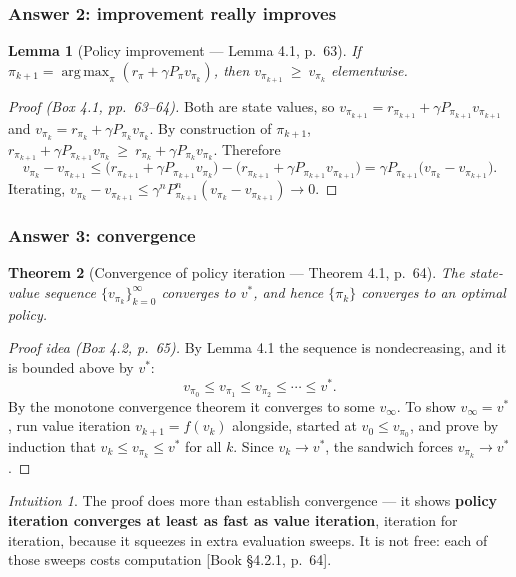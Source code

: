 \documentclass[11pt, letterpaper]{article}
\theoremstyle{runin}
\theoremstyle{runinplain}
\newtheorem{theorem}{Theorem}[section]
\newtheorem{lemma}[theorem]{Lemma}
\theoremstyle{remark}
\newtheorem*{intuition}{Intuition}
\newcommand{\argmax}{\operatorname*{arg\,max}}
\newcommand{\bkin}[1]{{\color{bookblue}\small[\textsf{Book #1}]}}
\begin{document}
\subsubsection{Answer 2: improvement really improves}

\begin{lemma}[Policy improvement --- Lemma 4.1, p.~63]
If $\pi_{k+1}=\argmax_\pi(r_\pi+\gamma P_\pi v_{\pi_k})$, then
$v_{\pi_{k+1}}\ \ge\ v_{\pi_k}$ elementwise.
\end{lemma}

\begin{proof}[Proof (Box 4.1, pp.~63--64)]
Both are state values, so $v_{\pi_{k+1}}=r_{\pi_{k+1}}+\gamma P_{\pi_{k+1}}v_{\pi_{k+1}}$
and $v_{\pi_k}=r_{\pi_k}+\gamma P_{\pi_k}v_{\pi_k}$. By construction of $\pi_{k+1}$,
$r_{\pi_{k+1}}+\gamma P_{\pi_{k+1}}v_{\pi_k}\ \ge\ r_{\pi_k}+\gamma P_{\pi_k}v_{\pi_k}$.
Therefore
\[
  v_{\pi_k}-v_{\pi_{k+1}}
  \le \bigl(r_{\pi_{k+1}}+\gamma P_{\pi_{k+1}}v_{\pi_k}\bigr)
     -\bigl(r_{\pi_{k+1}}+\gamma P_{\pi_{k+1}}v_{\pi_{k+1}}\bigr)
  = \gamma P_{\pi_{k+1}}\bigl(v_{\pi_k}-v_{\pi_{k+1}}\bigr).
\]
Iterating, $v_{\pi_k}-v_{\pi_{k+1}}\le\gamma^nP^n_{\pi_{k+1}}(v_{\pi_k}-v_{\pi_{k+1}})\to0$.
\end{proof}

\subsubsection{Answer 3: convergence}

\begin{theorem}[Convergence of policy iteration --- Theorem 4.1, p.~64]
The state-value sequence $\{v_{\pi_k}\}_{k=0}^\infty$ converges to $v^*$, and hence
$\{\pi_k\}$ converges to an optimal policy.
\end{theorem}

\begin{proof}[Proof idea (Box 4.2, p.~65)]
By Lemma 4.1 the sequence is nondecreasing, and it is bounded above by $v^*$:
\[
  v_{\pi_0}\le v_{\pi_1}\le v_{\pi_2}\le\cdots\le v^* .
\]
By the monotone convergence theorem it converges to some $v_\infty$. To show
$v_\infty=v^*$, run value iteration $v_{k+1}=f(v_k)$ alongside, started at
$v_0\le v_{\pi_0}$, and prove by induction that $v_k\le v_{\pi_k}\le v^*$ for all
$k$. Since $v_k\to v^*$, the sandwich forces $v_{\pi_k}\to v^*$.
\end{proof}

\begin{intuition}
The proof does more than establish convergence --- it shows \textbf{policy
iteration converges at least as fast as value iteration}, iteration for iteration,
because it squeezes in extra evaluation sweeps. It is not free: each of those
sweeps costs computation \bkin{\S4.2.1, p.~64}.
\end{intuition}
\end{document}
